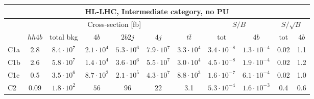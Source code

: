 \begin{tabular}{|l|cc|cccc|cc|cc|}
  \hline
\multicolumn{11}{|c|}{HL-LHC, Intermediate category, no PU}\\
\hline
&  \multicolumn{6}{c|}{Cross-section [fb]} &  \multicolumn{2}{c|}{$S/B$}  &  \multicolumn{2}{c|}{$S/\sqrt{B}$}  \\
   &  $hh4b$ &  total bkg  &   $4b$    &  $2b2j$   &   $4j$    &
$t\bar{t}$ &
tot & $4b$ & tot & $4b$ \\
  \hline
  \hline
C1a     & 2.8  &   $8.4\cdot 10^7$   & $2.1\cdot 10^4$ & $5.3\cdot 10^6$ & $7.9\cdot 10^7$ & $3.3\cdot 10^4$ &  $3.4\cdot 10^{-8}$   & $1.3\cdot 10^{-4}$  &   0.02   & 1.1 \\
 C1b     & 2.6  &   $5.8\cdot 10^7$   & $1.4\cdot 10^4$ & $3.6\cdot 10^6$ & $5.5\cdot 10^7$ & $3.0\cdot 10^4$ &  $4.5\cdot 10^{-8}$   & $1.9\cdot 10^{-4}$  &   0.02  & 1.2\\
 C1c     & 0.5  &   $3.5\cdot 10^6$   & $8.7\cdot 10^2$ & $2.1\cdot 10^5$ & $4.3\cdot 10^7$ & $8.8\cdot 10^3$ &  $1.6\cdot 10^{-7}$   & $6.1\cdot 10^{-4}$  &   0.02   & 1.0\\
 C2      & 0.09  &  $1.8\cdot 10^2$   & $56$ & $96$ & $22$ & 3.1             & $5.3\cdot 10^{-4}$    & $1.6\cdot 10^{-3}$  &   0.4   & 0.6 \\
\hline
\end{tabular}
